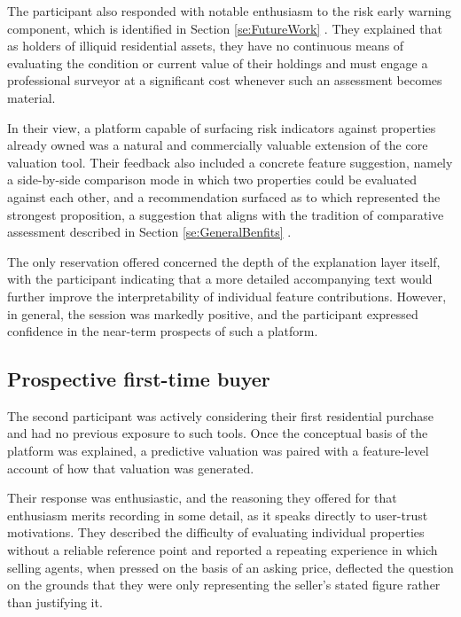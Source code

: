 The participant also responded with notable enthusiasm to the risk early warning component, which is identified in Section \ref{se:FutureWork} . They explained that as holders of illiquid residential assets, they have no continuous means of evaluating the condition or current value of their holdings and must engage a professional surveyor at a significant cost whenever such an assessment becomes material. 

In their view, a platform capable of surfacing risk indicators against properties already owned was a natural and commercially valuable extension of the core valuation tool. Their feedback also included a concrete feature suggestion, namely a side-by-side comparison mode in which two properties could be evaluated against each other, and a recommendation surfaced as to which represented the strongest proposition, a suggestion that aligns with the tradition of comparative assessment described in Section \ref{se:GeneralBenfits} .

The only reservation offered concerned the depth of the explanation layer itself, with the participant indicating that a more detailed accompanying text would further improve the interpretability of individual feature contributions. However, in general, the session was markedly positive, and the participant expressed confidence in the near-term prospects of such a platform.


\subsection{Prospective first-time buyer}

The second participant was actively considering their first residential purchase and had no previous exposure to such tools. Once the conceptual basis of the platform was explained, a predictive valuation was paired with a feature-level account of how that valuation was generated. 

Their response was enthusiastic, and the reasoning they offered for that enthusiasm merits recording in some detail, as it speaks directly to user-trust motivations. They described the difficulty of evaluating individual properties without a reliable reference point and reported a repeating experience in which selling agents, when pressed on the basis of an asking price, deflected the question on the grounds that they were only representing the seller's stated figure rather than justifying it. 

